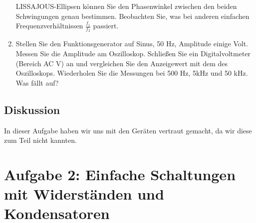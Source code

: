 \documentclass[12pt]{scrartcl}
\begin{document}
\begin{enumerate}
LISSAJOUS-Ellipsen können Sie den Phasenwinkel zwischen den beiden Schwingungen genau bestimmen. Beobachten Sie, was bei anderen einfachen Frequenzverhältnissen $\frac{f_1}{f_2}$ passiert.
\item
Stellen Sie den Funktionsgenerator auf Sinus, 50 Hz, Amplitude einige Volt. Messen Sie die Amplitude am Oszilloskop. Schließen Sie ein Digitalvoltmeter (Bereich AC V) an und vergleichen Sie den Anzeigewert mit dem des Oszilloskops. Wiederholen Sie die Messungen bei 500 Hz, 5kHz und 50 kHz. Was fällt auf?
\end{enumerate}
\subsection{Diskussion}
In dieser Aufgabe haben wir uns mit den Geräten vertraut gemacht, da wir diese zum Teil nicht kannten.
\section{Aufgabe 2: Einfache Schaltungen mit Widerständen und Kondensatoren}
\end{document}
